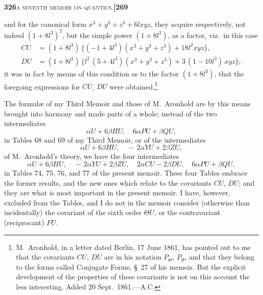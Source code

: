 \documentclass[11pt]{article}
\begin{document}
\newpage
\setcounter{page}{326}

\noindent\textbf{326}\hfill\textsc{a seventh memoir on quantics.}\hfill\textbf{[269}

\medskip

\noindent and for the canonical form $x^3 + y^3 + z^3 + 6 l x y z$, they acquire respectively, not indeed $(1 + 8 l^3)^2$, but the simple power $(1 + 8 l^3)$, as a factor, viz.\ in this case
\[
\begin{aligned}
   C U &= (1 + 8 l^3)\,\{(-1 + 4 l^3)(x^3 + y^3 + z^3) + 18 l^2 x y z\},\\
   D U &= (1 + 8 l^3)\,\{l^2\,(5 + 4 l^3)(x^3 + y^3 + z^3) + 3\,(1 - 10 l^3)\,x y z\};
\end{aligned}
\]
it was in fact by means of this condition as to the factor $(1 + 8 l^3)$, that the foregoing expressions for $C U$, $D U$ were obtained.\footnote{M.~Aronhold, in a letter dated Berlin, 17 June 1861, has pointed out to me that the covariants $C U$, $D U$ are in his notation $P_{\Theta}$, $P_{\Psi}$, and that they belong to the forms called Conjugate Forms, \S~27 of his memoir. But the explicit development of the properties of these covariants is not on this account the less interesting. Added 20 Sept.\ 1861.---A.C.}

\medskip

\noindent The formul\ae{} of my Third Memoir and those of M.~Aronhold are by this means brought into harmony and made parts of a whole; instead of the two intermediates
\[
   \alpha U + 6\beta H U,\quad 6\alpha P U + \beta Q U,
\]
in Tables 68 and 69 of my Third Memoir, or of the intermediates
\[
   \alpha U + 6\beta H U,\quad -\,2\alpha Y U + 2\beta Z U,
\]
of M.~Aronhold's theory, we have the four intermediates
\[
   \alpha U + 6\beta H U,\quad -\,2\alpha Y U + 2\beta Z U,\quad 2\alpha C U - 2\beta D U,\quad 6\alpha P U + \beta Q U,
\]
in Tables 74, 75, 76, and 77 of the present memoir. These four Tables embrace the former results, and the new ones which relate to the covariants $C U$, $D U$; and they are what is most important in the present memoir. I have, however, excluded from the Tables, and I do not in the memoir consider (otherwise than incidentally) the covariant of the sixth order $\Theta U$, or the contravariant (reciprocant) $F U$.

\medskip
\end{document}
